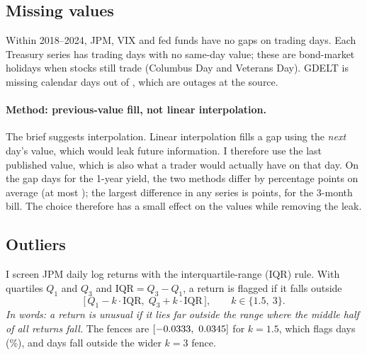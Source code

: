 \documentclass[11pt]{article}
\begin{document}
\subsection{Missing values}
Within 2018--2024, JPM, VIX and fed funds have no gaps on trading days. Each Treasury series has
\wGapdaysdgsone{} trading days with no same-day value; these are bond-market holidays when stocks still trade
(Columbus Day and Veterans Day). GDELT is missing \wGdeltmissing{} calendar days out of \wGdeltdays{}, which are
outages at the source.

\paragraph{Method: previous-value fill, not linear interpolation.} The brief suggests interpolation. Linear
interpolation fills a gap using the \emph{next} day's value, which would leak future information. I therefore use the
last published value, which is also what a trader would actually have on that day. On the \wGapdaysdgsone{} gap days
for the 1-year yield, the two methods differ by \wGapmeandiffdgsone{} percentage points on average (at most
\wGapmaxdiffdgsone{}); the largest difference in any series is \wGapmaxdiffpp{} points, for the 3-month bill. The
choice therefore has a small effect on the values while removing the leak.

\subsection{Outliers}
I screen JPM daily log returns with the interquartile-range (IQR) rule. With quartiles $Q_1$ and $Q_3$ and
$\mathrm{IQR} = Q_3 - Q_1$, a return is flagged if it falls outside
\begin{equation}
  \bigl[\,Q_1 - k\cdot\mathrm{IQR},\; Q_3 + k\cdot\mathrm{IQR}\,\bigr], \qquad k \in \{1.5,\ 3\}.
\end{equation}
\emph{In words: a return is unusual if it lies far outside the range where the middle half of all returns fall.}
The fences are $[-0.0333,\ 0.0345]$ for $k=1.5$, which flags \wFlagsonefive{} days (\wFlagsonefiveshare\%), and
\wFlagsthree{} days fall outside the wider $k=3$ fence.
\end{document}
